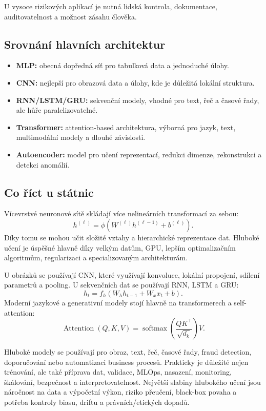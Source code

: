 U vysoce rizikových aplikací je nutná lidská kontrola, dokumentace, auditovatelnost a možnost zásahu člověka.

\subsection{Srovnání hlavních architektur}

\begin{itemize}
    \item \textbf{MLP:}
    obecná dopředná síť pro tabulková data a jednoduché úlohy.
    
    \item \textbf{CNN:}
    nejlepší pro obrazová data a úlohy, kde je důležitá lokální struktura.
    
    \item \textbf{RNN/LSTM/GRU:}
    sekvenční modely, vhodné pro text, řeč a časové řady, ale hůře paralelizovatelné.
    
    \item \textbf{Transformer:}
    attention-based architektura, výborná pro jazyk, text, multimodální modely a dlouhé závislosti.
    
    \item \textbf{Autoencoder:}
    model pro učení reprezentací, redukci dimenze, rekonstrukci a detekci anomálií.
\end{itemize}

\subsection{Co říct u státnic}

Vícevrstvé neuronové sítě skládají více nelineárních transformací za sebou:
\[
h^{(\ell)}
=
\phi(W^{(\ell)}h^{(\ell-1)}+b^{(\ell)}).
\]
Díky tomu se mohou učit složité vztahy a hierarchické reprezentace dat. Hluboké učení je úspěšné hlavně díky
velkým datům, GPU, lepším optimalizačním algoritmům, regularizaci a specializovaným architekturám.

U obrázků se používají CNN, které využívají konvoluce, lokální propojení, sdílení parametrů a pooling.
U sekvenčních dat se používají RNN, LSTM a GRU:
\[
h_t=f_h(W_hh_{t-1}+W_xx_t+b).
\]
Moderní jazykové a generativní modely stojí hlavně na transformerech a self-attention:
\[
\operatorname{Attention}(Q,K,V)
=
\operatorname{softmax}
\left(
\frac{QK^\top}{\sqrt{d_k}}
\right)V.
\]

Hluboké modely se používají pro obraz, text, řeč, časové řady, fraud detection, doporučování nebo automatizaci
business procesů. Prakticky je důležité nejen trénování, ale také příprava dat, validace, MLOps, nasazení,
monitoring, škálování, bezpečnost a interpretovatelnost. Největší slabiny hlubokého učení jsou náročnost na
data a výpočetní výkon, riziko přeučení, black-box povaha a potřeba kontroly biasu, driftu a právních/etických
dopadů.

